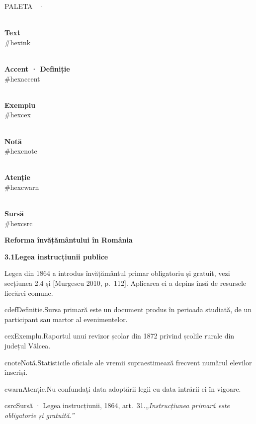 \documentclass[10pt]{article}
\newcommand\Swatch[2]{\begin{minipage}[t]{24mm}\centering{\color{#1}\rule{22mm}{11mm}}\\[1pt]{\sffamily\scriptsize\textbf{#2}\\\color{muted}\#\csname hex#1\endcsname}\end{minipage}}
\begin{document}
{\sffamily\footnotesize\color{muted}PALETA \PaletteLetter\ · \MakeUppercase{\PaletteName}}\par\smallskip
{\small\color{muted}\PaletteNote}\par\medskip
\Swatch{ink}{Text}\Swatch{accent}{Accent · Definiție}\Swatch{cex}{Exemplu}\Swatch{cnote}{Notă}\Swatch{cwarn}{Atenție}\Swatch{csrc}{Sursă}
\par\vspace{12pt}
{\sffamily\bfseries\fontsize{19}{23}\selectfont Reforma învățământului în România\par}
\par
\vspace{2pt}{\color{accent}\rule{\linewidth}{0.6pt}}\par\vspace{8pt}
{\sffamily\bfseries\large\color{accent}3.1\quad\color{ink}Legea instrucțiunii publice}\par\vspace{4pt}
Legea din 1864 a introdus învățământul primar obligatoriu și gratuit, \textcolor{accent}{vezi secțiunea 2.4} și \textcolor{accent}{[Murgescu 2010, p.~112]}. Aplicarea ei a depins însă de resursele fiecărei comune.

\begin{block}{cdef}{Definiție.}Sursa primară este un document produs în perioada studiată, de un participant sau martor al evenimentelor.\end{block}
\begin{block}{cex}{Exemplu.}Raportul unui revizor școlar din 1872 privind școlile rurale din județul Vâlcea.\end{block}
\begin{block}{cnote}{Notă.}Statisticile oficiale ale vremii supraestimează frecvent numărul elevilor înscriși.\end{block}
\begin{block}{cwarn}{Atenție.}Nu confundați data adoptării legii cu data intrării ei în vigoare.\end{block}
\begin{block}{csrc}{Sursă · Legea instrucțiunii, 1864, art.~31.}\itshape „Instrucțiunea primară este obligatorie și gratuită.”\end{block}
\end{document}
